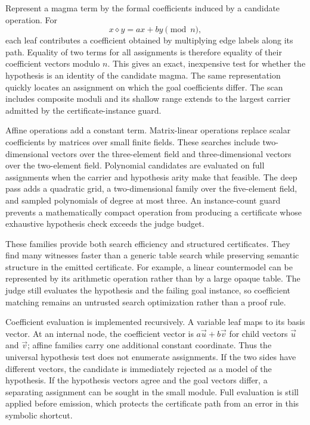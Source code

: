 \documentclass[10pt,twocolumn]{article}
\newcommand{\op}{\mathbin{\diamond}}
\begin{document}
Represent a magma term by the formal coefficients induced by a candidate
operation.  For
\[
  x \op y = ax+by \pmod n,
\]
each leaf contributes a coefficient obtained by multiplying edge labels along
its path.  Equality of two terms for all assignments is therefore equality of
their coefficient vectors modulo $n$.  This gives an exact, inexpensive test
for whether the hypothesis is an identity of the candidate magma.  The same
representation quickly locates an assignment on which the goal coefficients
differ.  The scan includes composite moduli and its shallow range extends to
the largest carrier admitted by the certificate-instance guard.

Affine operations add a constant term.  Matrix-linear operations replace
scalar coefficients by matrices over small finite fields.  These searches
include two-dimensional vectors over the three-element field and
three-dimensional vectors over the two-element field.  Polynomial candidates
are evaluated on full assignments when the carrier and hypothesis arity make
that feasible.  The deep pass adds a quadratic grid, a two-dimensional family
over the five-element field, and sampled polynomials of degree at most three.
An instance-count guard prevents a mathematically compact operation from
producing a certificate whose exhaustive hypothesis check exceeds the judge
budget.

These families provide both search efficiency and structured certificates.
They find many witnesses faster than a generic table search while preserving
semantic structure in the emitted certificate.  For example, a linear
countermodel can be represented by its arithmetic operation rather than by a
large opaque table.  The judge still evaluates the hypothesis and the failing
goal instance, so coefficient matching remains an untrusted search
optimization rather than a proof rule.

Coefficient evaluation is implemented recursively.  A variable leaf maps to
its basis vector.  At an internal node, the coefficient vector is
$a\vec{u}+b\vec{v}$ for child vectors $\vec{u}$ and $\vec{v}$; affine families
carry one additional constant coordinate.  Thus the universal hypothesis test
does not enumerate assignments.  If the two sides have different vectors,
the candidate is immediately rejected as a model of the hypothesis.  If the
hypothesis vectors agree and the goal vectors differ, a separating assignment
can be sought in the small module.  Full evaluation is still applied before
emission, which protects the certificate path from an error in this symbolic
shortcut.
\end{document}
